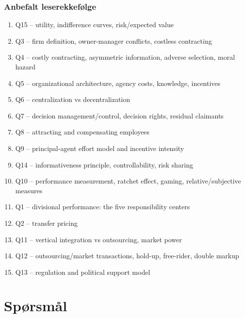 \documentclass[11pt, a4paper]{article}
\begin{document}
\section*{Anbefalt leserekkefølge}
\begin{enumerate}
  \item Q15 -- utility, indifference curves, risk/expected value
  \item Q3 -- firm definition, owner-manager conflicts, costless contracting
  \item Q4 -- costly contracting, asymmetric information, adverse selection, moral hazard
  \item Q5 -- organizational architecture, agency costs, knowledge, incentives
  \item Q6 -- centralization vs decentralization
  \item Q7 -- decision management/control, decision rights, residual claimants
  \item Q8 -- attracting and compensating employees
  \item Q9 -- principal-agent effort model and incentive intensity
  \item Q14 -- informativeness principle, controllability, risk sharing
  \item Q10 -- performance measurement, ratchet effect, gaming, relative/subjective measures
  \item Q1 -- divisional performance: the five responsibility centers
  \item Q2 -- transfer pricing
  \item Q11 -- vertical integration vs outsourcing, market power
  \item Q12 -- outsourcing/market transactions, hold-up, free-rider, double markup
  \item Q13 -- regulation and political support model
\end{enumerate}

\part{Spørsmål}















\end{document}
